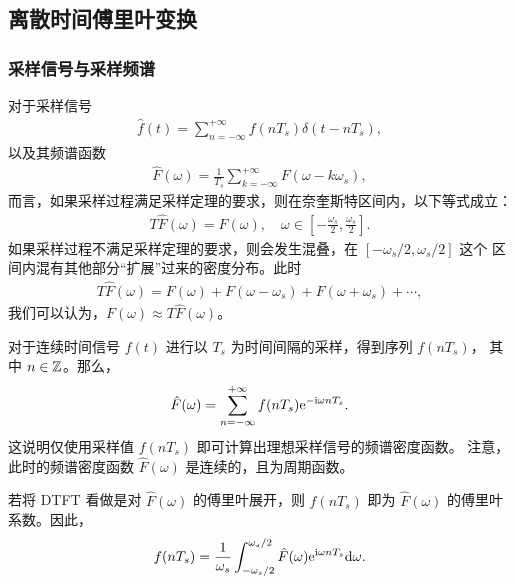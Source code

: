 \subsection{离散时间傅里叶变换}

\subsubsection{采样信号与采样频谱}

对于采样信号
\begin{align*}
    \hat{f}(t) = \sum_{n = -\infty}^{+\infty}f(nT_s)\delta(t - nT_s),
\end{align*}
以及其频谱函数
\begin{align*}
    \hat{F}(\omega) = \frac{1}{T_s}\sum_{k = -\infty}^{+\infty}F(\omega - k\omega_s),
\end{align*}
而言，如果采样过程满足采样定理的要求，则在奈奎斯特区间内，以下等式成立：
\begin{align*}
    T\hat{F}(\omega) = F(\omega), \quad \omega \in \left[-\frac{\omega_s}{2}, \frac{\omega_s}{2}\right].
\end{align*}
如果采样过程不满足采样定理的要求，则会发生混叠，在 $[-\omega_s/2, \omega_s/2]$ 这个
区间内混有其他部分``扩展''过来的密度分布。此时
\begin{align*}
    T\hat{F}(\omega) = F(\omega) + F(\omega - \omega_s) + F(\omega + \omega_s) + \cdots,
\end{align*}
我们可以认为，$F(\omega) \approx T\hat{F}(\omega)$。

\begin{theorem}
    对于连续时间信号 $f(t)$ 进行以 $T_s$ 为时间间隔的采样，得到序列 $f(nT_s)$，
    其中 $n \in \mathbb{Z}$。那么，
    \begin{align*}
        \hat{F}(\omega) = \sum_{n = -\infty}^{+\infty}f(nT_s)\mathrm{e}^{-\mathrm{i}\omega nT_s}.
    \end{align*}
    这说明仅使用采样值 $f(nT_s)$ 即可计算出理想采样信号的频谱密度函数。
    注意，此时的频谱密度函数 $\hat{F}(\omega)$ 是连续的，且为周期函数。
\end{theorem}

\begin{theorem}
    若将 DTFT 看做是对 $\hat{F}(\omega)$ 的傅里叶展开，则 $f(nT_s)$ 即为
    $\hat{F}(\omega)$ 的傅里叶系数。因此，
    \begin{align*}
        f(nT_s) = \frac{1}{\omega_s}\int_{-\omega_s/2}^{\omega_s/2}\hat{F}(\omega)\mathrm{e}^{\mathrm{i}\omega nT_s}\mathrm{d}\omega.
    \end{align*}
\end{theorem}

